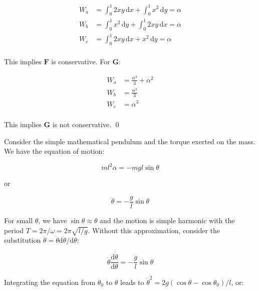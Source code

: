 \documentclass[12pt]{article}
\begin{document}
\begin{equation}
\begin{split}
    W_{a} &= \int_{0}^{1} 2xy \, \mathrm{d}x + \int_{0}^{1} x^{2} \, \mathrm{d}y = \alpha \\
    W_{b} &= \int_{0}^{1} x^{2} \, \mathrm{d}y + \int_{0}^{1} 2xy \, \mathrm{d}x = \alpha \\
    W_{c} &= \int_{0}^{1} 2xy \, \mathrm{d}x + x^{2} \, \mathrm{d}y = \alpha \\
\end{split}
\end{equation}

This implies $\mathbf{F}$ is conservative. For $\mathbf{G}$:

\begin{equation}
\begin{split}
    W_{a} &= \frac{\alpha^{3}}{3} + \alpha^{2} \\
    W_{b} &= \frac{\alpha^{3}}{3} \\
    W_{c} &= \alpha^{3} \\
\end{split}
\end{equation}

This implies $\mathbf{G}$ is not conservative.
\qed



Consider the simple mathematical pendulum and the torque exerted on the mass. We have the equation of motion:

\begin{equation}
    ml^{2} \alpha = -mgl \sin{\theta}
\end{equation}

or

\begin{equation}
    \ddot{\theta} = -\frac{g}{l} \sin{\theta}
\end{equation}

For small $\theta$, we have $\sin{\theta} \approx \theta$ and the motion is simple harmonic with the period $T = 2\pi/\omega = 2\pi \sqrt{l/g}$. Without this approximation, consider the substitution $\ddot{\theta} = \dot{\theta} \mathrm{d}\dot{\theta}/\mathrm{d}\theta$:

\begin{equation}
    \dot{\theta} \frac{\mathrm{d}\dot{\theta}}{\mathrm{d}\theta} = -\frac{g}{l} \sin{\theta}
\end{equation}

Integrating the equation from $\theta_{0}$ to $\theta$ leads to $\dot{\theta}^{2} = 2g(\cos{\theta} - \cos{\theta_{0}})/l$, or:
\end{document}
